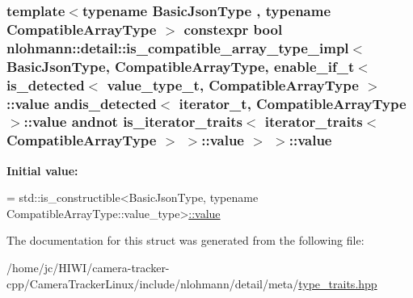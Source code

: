 \subsubsection[{\texorpdfstring{value}{value}}]{\setlength{\rightskip}{0pt plus 5cm}template$<$typename Basic\+Json\+Type , typename Compatible\+Array\+Type $>$ constexpr bool {\bf nlohmann\+::detail\+::is\+\_\+compatible\+\_\+array\+\_\+type\+\_\+impl}$<$ Basic\+Json\+Type, Compatible\+Array\+Type, {\bf enable\+\_\+if\+\_\+t}$<$ {\bf is\+\_\+detected}$<$ {\bf value\+\_\+type\+\_\+t}, Compatible\+Array\+Type $>$\+::value andis\+\_\+detected$<$ {\bf iterator\+\_\+t}, Compatible\+Array\+Type $>$\+::value andnot {\bf is\+\_\+iterator\+\_\+traits}$<$ {\bf iterator\+\_\+traits}$<$ Compatible\+Array\+Type $>$ $>$\+::value $>$ $>$\+::value\hspace{0.3cm}{\ttfamily [static]}}\hypertarget{structnlohmann_1_1detail_1_1is__compatible__array__type__impl_3_01_basic_json_type_00_01_compatia6522f047ce0d0bd05b38ab6101e8786_aab057cae4562619c319310b5477425cb}{}\label{structnlohmann_1_1detail_1_1is__compatible__array__type__impl_3_01_basic_json_type_00_01_compatia6522f047ce0d0bd05b38ab6101e8786_aab057cae4562619c319310b5477425cb}
{\bfseries Initial value\+:}
\begin{DoxyCode}
=
        std::is\_constructible<BasicJsonType,
        \textcolor{keyword}{typename} CompatibleArrayType::value\_type>\hyperlink{structnlohmann_1_1detail_1_1is__compatible__array__type__impl_3_01_basic_json_type_00_01_compatia6522f047ce0d0bd05b38ab6101e8786_aab057cae4562619c319310b5477425cb}{::value}
\end{DoxyCode}


The documentation for this struct was generated from the following file\+:\begin{DoxyCompactItemize}
\item 
/home/jc/\+H\+I\+W\+I/camera-\/tracker-\/cpp/\+Camera\+Tracker\+Linux/include/nlohmann/detail/meta/\hyperlink{type__traits_8hpp}{type\+\_\+traits.\+hpp}\end{DoxyCompactItemize}
